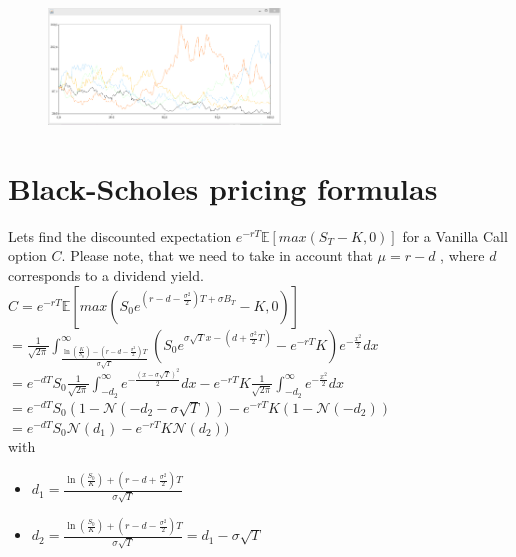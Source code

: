 \documentclass[a4paper]{report}
\begin{document}
\begin{itemize}
\begin{figure}[H]
    \centering
    \includegraphics[width=0.55\textwidth]{merton.png}
\end{figure}



\section{ Black-Scholes pricing formulas }

Lets find the discounted expectation $e^{-rT}\mathbb{E}[max(S_T - K,0)]$ for a Vanilla Call option $C$. Please note, that we need to take in account that $\mu = r - d$ , where $d$ corresponds to a dividend yield. \\

$C = e ^{-rT} \mathbb{E} [max(S_0 e^{(r-d - \frac{\sigma^2}{2}) T + \sigma B_T} -K, 0)]$\\



$=\frac{1}{\sqrt{2 \pi} } \int_{\frac{\ln (\frac{K}{S_0}) - (r-d - \frac{\sigma^2}{2} )T}{\sigma \sqrt{T}}}^\infty (S_0 e^{\sigma \sqrt{T} x - (d+\frac{\sigma^2}{2} T)} - e^{-rT} K)e^{-\frac{x^2}{2}} dx $\\



$=e^{-dT} S_0 \frac{1}{\sqrt{2 \pi}} \int_{-d_2}^\infty e^{-\frac{(x- \sigma \sqrt{T})^2}{2}}dx - e^{-rT} K \frac{1}{\sqrt{2 \pi}} \int_{-d_2}^\infty e^{-\frac{x^2}{2}} dx $\\



$=e^{-dT} S_0 (1 - \mathcal{N}(-d_2-\sigma \sqrt{T}))-e^{-rT}K(1-\mathcal{N}(-d_2)) $\\


$=e^{-dT}S_0 \mathcal{N}(d_1)-e^{-rT}K\mathcal{N}(d_2))$\\
\newline
with
\begin{itemize}
\item
$ d_1 = \frac{\ln (\frac{S_0}{K}) + (r-d + \frac{\sigma^2}{2} )T}{\sigma \sqrt{T}} $ 
\item
$ d_2 = \frac{\ln (\frac{S_0}{K}) + (r-d - \frac{\sigma^2}{2} )T}{\sigma \sqrt{T}}  = d_1 -{\sigma \sqrt{T}}$ 


\end{itemize}
\end{itemize}
\end{document}
